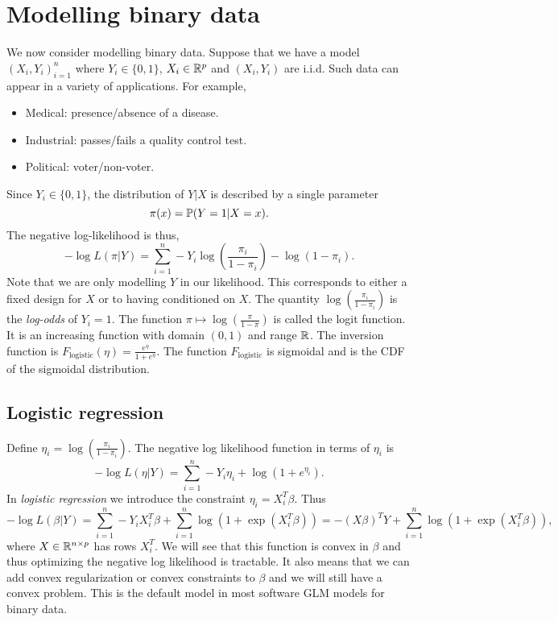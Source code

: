 \section{Modelling binary data}
We now consider modelling binary data. Suppose that we have a model $(X_i,Y_i)_{i=1}^n$ where $Y_i \in \{0,1\}$, $X_i \in {\mathbb R}^p$ and $(X_i,Y_i)$ are i.i.d. Such data can appear in a variety of applications. For example,
\begin{itemize}
    \item Medical: presence/absence of a disease.
    \item Industrial: passes/fails a quality control test.
    \item Political: voter/non-voter.
\end{itemize}
Since $Y_i \in \{0,1\}$, the distribution of $Y|X$ is described by a single parameter
\[\pi(x) = {\mathbb{P}}(Y =1|X=x). \]
The negative log-likelihood is thus,
\[-\log L(\pi|Y) = \sum_{i=1}^n - Y_i \log\left(\frac{\pi_i}{1-\pi_i}\right)-\log(1-\pi_i).\]
Note that we are only modelling $Y$ in our likelihood. This corresponds to either a fixed design for $X$ or to having conditioned on $X$. The quantity $\log\left(\frac{\pi_i}{1-\pi_i}\right)$ is the \emph{log-odds} of $Y_i=1$. The function $\pi \mapsto \log\left(\frac{\pi}{1-\pi}\right)$ is called the logit function. It is an increasing function with domain $(0,1)$ and range ${\mathbb R}$. The inversion function is $F_{\text{logistic}}(\eta) = \frac{e^\eta}{1+e^{\eta}}$. The function $F_{\text{logistic}}$ is sigmoidal and is the CDF of the sigmoidal distribution.
\subsection{Logistic regression}
Define $\eta_i = \log\left(\frac{\pi_i}{1-\pi_i}\right)$. The negative log likelihood function in terms of $\eta_i$ is
\[-\log L(\eta|Y) = \sum_{i=1}^n -Y_i\eta_i +\log(1+e^{\eta_i}). \]
In \emph{logistic regression} we introduce the constraint $\eta_i = X_i^T\beta$. Thus 
\[-\log L(\beta|Y) = \sum_{i=1}^n -Y_iX_i^T\beta +\sum_{i=1}^n \log(1+\exp(X_i^T\beta)) = -(X\beta)^TY +\sum_{i=1}^n \log(1+\exp(X_i^T\beta)), \]
where $X \in {\mathbb R}^{n \times p}$ has rows $X_i^T$. We will see that this function is convex in $\beta$ and thus optimizing the negative log likelihood is tractable. It also means that we can add convex regularization or convex constraints to $\beta$ and we will still have a convex problem.  This is the default model in most software GLM models for binary data. 

